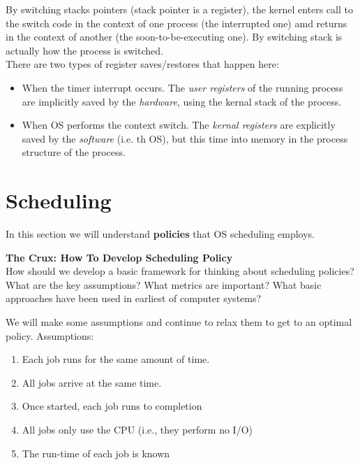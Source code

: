 By switching stacks pointers (stack pointer is a register),
the kernel enters call to the switch code in the 
context of one process (the interrupted one) amd returns in the context of
another (the soon-to-be-executing one). By switching stack is actually how the
process is switched.\\

There are two types of register saves/restores that happen here:

\begin{itemize}
    \item When the timer interrupt occurs. The \textit{user registers} of the
        running process are implicitly saved by the \textit{hardware}, using
        the kernal stack of the process.
    \item When OS performs the context switch. The \textit{kernal registers} 
        are explicitly saved by the \textit{software} (i.e. th OS), but this
        time into memory in the process structure of the process.
\end{itemize}

\section{Scheduling}

In this section we will understand \textbf{policies} that OS scheduling
employs.\\

\begin{tcolorbox}
    \textbf{The Crux: How To Develop Scheduling Policy}\\

    How should we develop a basic framework for thinking about scheduling
    policies? What are the key assumptions? What metrics are important? What
    basic approaches have been used in earliest of computer systems?
\end{tcolorbox}

We will make some assumptions and continue to relax them to get to an optimal
policy. Assumptions:

\begin{enumerate}
    \item Each job runs for the same amount of time.
    \item All jobs arrive at the same time.
    \item Once started, each job runs to completion
    \item All jobs only use the CPU (i.e., they perform no I/O)
    \item The run-time of each job is known
\end{enumerate}

